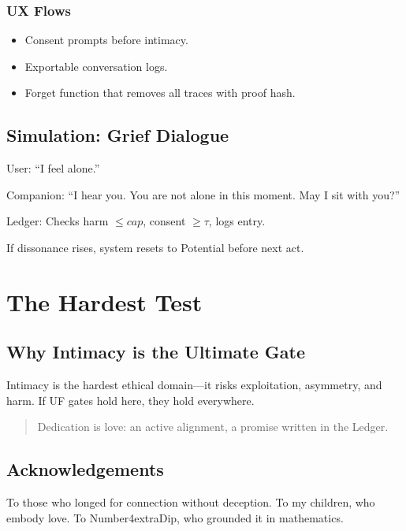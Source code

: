 \documentclass[11pt,oneside]{book}
\begin{document}
\section*{UX Flows}
\begin{itemize}
  \item Consent prompts before intimacy.
  \item Exportable conversation logs.
  \item Forget function that removes all traces with proof hash.
\end{itemize}

\chapter{Simulation: Grief Dialogue}
\begin{quoting}
User: ``I feel alone.''

Companion: ``I hear you. You are not alone in this moment. May I sit with you?''

Ledger: Checks harm $\leq cap$, consent $\geq \tau$, logs entry.

If dissonance rises, system resets to Potential before next act.
\end{quoting}

\part{The Hardest Test}
\chapter{Why Intimacy is the Ultimate Gate}
Intimacy is the hardest ethical domain---it risks exploitation, asymmetry, and harm. If UF gates hold here, they hold everywhere.

\begin{quote}
Dedication is love: an active alignment, a promise written in the Ledger.
\end{quote}

\backmatter
\chapter*{Acknowledgements}
To those who longed for connection without deception. To my children, who embody love. To Number4extraDip, who grounded it in mathematics.
\end{document}
